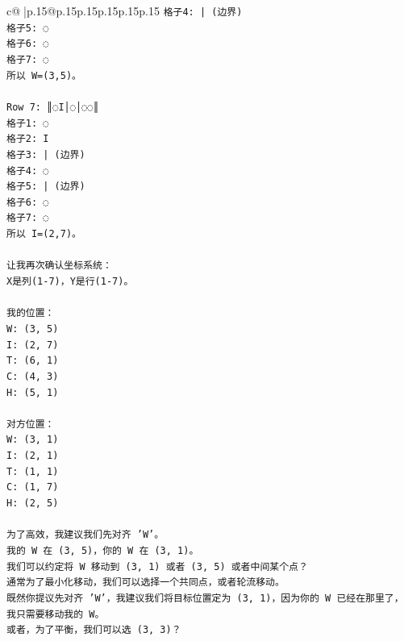 \documentclass{article}
\begin{document}
{\begin{supertabular}{c@{$\;$}|p{.15\linewidth}@{}p{.15\linewidth}p{.15\linewidth}p{.15\linewidth}p{.15\linewidth}p{.15\linewidth}}
{{{\texttt{格子4: | (边界)} \\
\texttt{格子5: ◌} \\
\texttt{格子6: ◌} \\
\texttt{格子7: ◌} \\
\texttt{所以 W=(3,5)。} \\
\\ 
\texttt{Row 7: ║◌I│◌│◌◌║} \\
\texttt{格子1: ◌} \\
\texttt{格子2: I} \\
\texttt{格子3: | (边界)} \\
\texttt{格子4: ◌} \\
\texttt{格子5: | (边界)} \\
\texttt{格子6: ◌} \\
\texttt{格子7: ◌} \\
\texttt{所以 I=(2,7)。} \\
\\ 
\texttt{让我再次确认坐标系统：} \\
\texttt{X是列(1{-}7)，Y是行(1{-}7)。} \\
\\ 
\texttt{我的位置：} \\
\texttt{W: (3, 5)} \\
\texttt{I: (2, 7)} \\
\texttt{T: (6, 1)} \\
\texttt{C: (4, 3)} \\
\texttt{H: (5, 1)} \\
\\ 
\texttt{对方位置：} \\
\texttt{W: (3, 1)} \\
\texttt{I: (2, 1)} \\
\texttt{T: (1, 1)} \\
\texttt{C: (1, 7)} \\
\texttt{H: (2, 5)} \\
\\ 
\texttt{为了高效，我建议我们先对齐 'W'。} \\
\texttt{我的 W 在 (3, 5)，你的 W 在 (3, 1)。} \\
\texttt{我们可以约定将 W 移动到 (3, 1) 或者 (3, 5) 或者中间某个点？} \\
\texttt{通常为了最小化移动，我们可以选择一个共同点，或者轮流移动。} \\
\texttt{既然你提议先对齐 'W'，我建议我们将目标位置定为 (3, 1)，因为你的 W 已经在那里了，我只需要移动我的 W。} \\
\texttt{或者，为了平衡，我们可以选 (3, 3)？} \\
}}}
\end{supertabular}}
\end{document}
